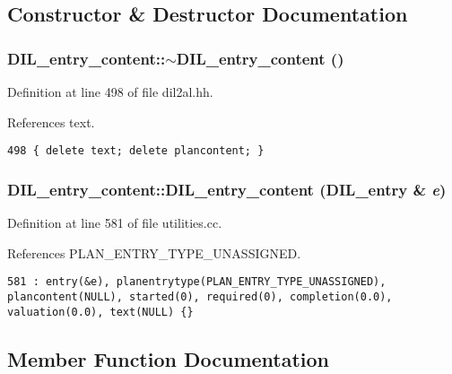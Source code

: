 \subsection{Constructor \& Destructor Documentation}
\subsubsection{\setlength{\rightskip}{0pt plus 5cm}DIL\_\-entry\_\-content::$\sim$DIL\_\-entry\_\-content ()\hspace{0.3cm}{\tt  [inline]}}\label{classDIL__entry__content_a0}




Definition at line 498 of file dil2al.hh.

References text.



\footnotesize\begin{verbatim}498 { delete text; delete plancontent; }
\end{verbatim}\normalsize 
{}
\subsubsection{\setlength{\rightskip}{0pt plus 5cm}DIL\_\-entry\_\-content::DIL\_\-entry\_\-content ({\bf DIL\_\-entry} \& {\em e})}\label{classDIL__entry__content_a1}




Definition at line 581 of file utilities.cc.

References PLAN\_\-ENTRY\_\-TYPE\_\-UNASSIGNED.



\footnotesize\begin{verbatim}581 : entry(&e), planentrytype(PLAN_ENTRY_TYPE_UNASSIGNED), plancontent(NULL), started(0), required(0), completion(0.0), valuation(0.0), text(NULL) {}
\end{verbatim}\normalsize 


\subsection{Member Function Documentation}
